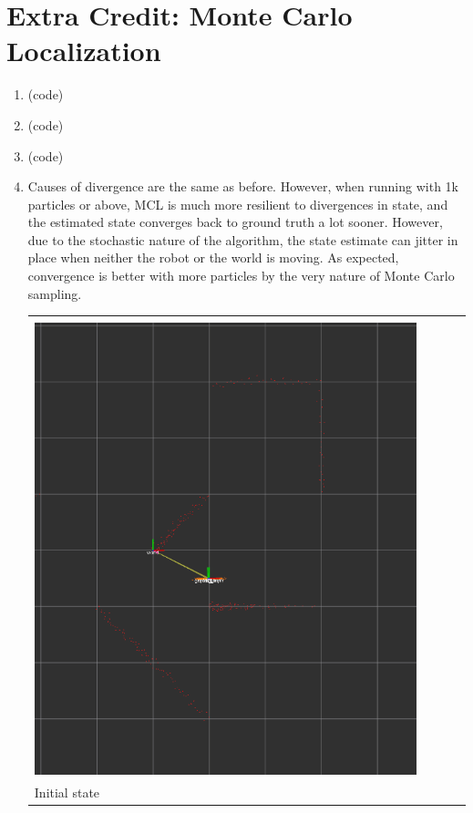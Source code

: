 \documentclass{article}
\begin{document}
\section*{Extra Credit: Monte Carlo Localization}
\begin{enumerate}[label=(\roman*)]
\item %
(code)

\item %
(code)

\item %
(code)

\item %
Causes of divergence are the same as before. However, when running with 1k particles or above, MCL is much more resilient to divergences in state, and the estimated state converges back to ground truth a lot sooner. However, due to the stochastic nature of the algorithm, the state estimate can jitter in place when neither the robot or the world is moving. As expected, convergence is better with more particles by the very nature of Monte Carlo sampling.

\begin{tabular}[t]{l}
	\hline \\
	\includegraphics[width=0.9\textwidth]{img/p3-initial.png} \\
	\hline
	Initial state \\
\end{tabular}


\end{enumerate}
\end{document}
